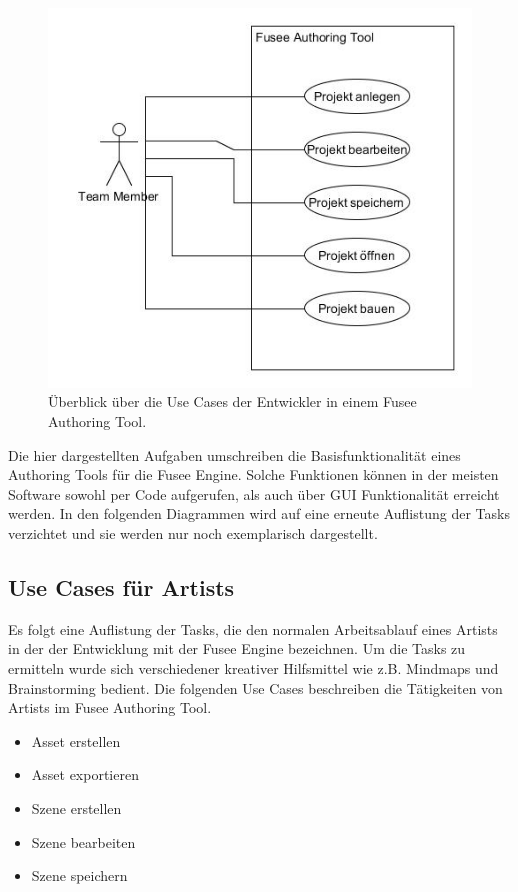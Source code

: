 \documentclass[pagesize, paper=a4, fontsize=12pt, titlepage=true, headings=small, headnosepline, abstractoff, liststotoc, nochapterprefix, plainheadsepline, twoside]{scrreprt}
\begin{document}
\begin{figure}[ht]
	\centering
	\includegraphics[width=\linewidth]{Bilder/UseCase_Allgemein.jpg}
	\caption{Überblick über die Use Cases der Entwickler in einem Fusee Authoring Tool.}
	\label{UseCaseAllgemein}
\end{figure}
Die hier dargestellten Aufgaben umschreiben die Basisfunktionalität eines Authoring Tools für die Fusee Engine. Solche Funktionen können in der meisten Software sowohl per Code aufgerufen, als auch über GUI Funktionalität erreicht werden. In den folgenden Diagrammen wird auf eine erneute Auflistung der Tasks verzichtet und sie werden nur noch exemplarisch dargestellt.

\subsection{Use Cases für Artists}
Es folgt eine Auflistung der Tasks, die den normalen Arbeitsablauf eines Artists in der der Entwicklung mit der Fusee Engine bezeichnen. Um die Tasks zu ermitteln wurde sich verschiedener kreativer Hilfsmittel wie z.B. Mindmaps und Brainstorming bedient. Die folgenden Use Cases beschreiben die Tätigkeiten von Artists im Fusee Authoring Tool.
\begin{itemize}
\item Asset erstellen
\item Asset exportieren
\item Szene erstellen
\item Szene bearbeiten
\item Szene speichern
\end{itemize}
\end{document}

